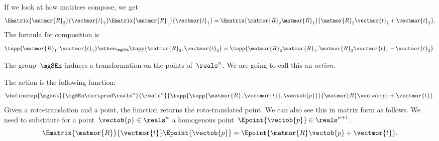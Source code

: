 If we look at how matrices compose, we get
%
\begin{equation}
    \label{eq:SE-composition}
    \Ematrix{\matmor{R}_2}{\vectmor{t}_2} \Ematrix{\matmor{R}_1}{\vectmor{t}_1} = \Ematrix{\matmor{R}_2 \matmor{R}_1}{\matmor{R}_2\vectmor{t}_1 + \vectmor{t}_2}.
\end{equation}
%
The formula for composition is
%
\begin{equation}
    \label{eq:SE-composition-short}
    \tupp{\matmor{R}_1, \vectmor{t}_1} \mthen_{\mgSEn} \tupp{\matmor{R}_2, \vectmor{t}_2}  = \tupp{\matmor{R}_2 \matmor{R}_1, \matmor{R}_2 \vectmor{t}_1 + \vectmor{t}_2}.
\end{equation}
%

%

The group~$\mgSEn$ induces a transformation on the points of~$\reals^n$.
We are going to call this an \emph{action}.

The action is the following function:
%
\begin{equation}
    \label{eq:apply}
    \definemap{\mgact}{\mgSEn \cartprod \reals^n}{\reals^n}{\tupp{ \tupp{\matmor{R}, \vectmor{t}}, \vectob{p}}}{\matmor{R}\vectob{p} + \vectmor{t}}.
\end{equation}
Given a roto-translation and a point, the function returns the roto-translated point.
%
We can also see this in matrix form as follows.
We need to substitute for a point~$\vectob{p} \in \reals^n$ a homogenous point~$\Epoint{\vectob{p}} \in \reals^{n+1}$.
%
\begin{equation}
    \label{eq:homogenous}
    \Ematrix{\matmor{R}}{\vectmor{t}}
    \Epoint{\vectob{p}}
    =
    \Epoint{\matmor{R}\vectob{p} + \vectmor{t}}.
\end{equation}
%

